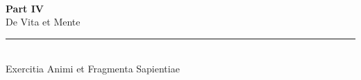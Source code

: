 \documentclass[12pt, a5paper, twoside]{book}
\let\cleardoublepage\clearpage %
\begin{document}

\begin{titlepage}
\thispagestyle{empty}
\vfill
~
\end{titlepage}
\cleardoublepage



\cleardoublepage
\thispagestyle{empty}
\vspace*{\fill}
\begin{center}
    {\normalfont\huge\bfseries Part IV}\\[0.5cm]
    {\Huge De Vita et Mente}\\[1ex]
    \rule[0.5ex]{5cm}{0.5pt}\\[1ex]
    {\small Exercitia Animi et Fragmenta Sapientiae}
\end{center}
\vspace*{\fill}
\cleardoublepage



















\cleardoublepage
\thispagestyle{empty}

\vspace*{\fill}
\cleardoublepage
\end{document}
